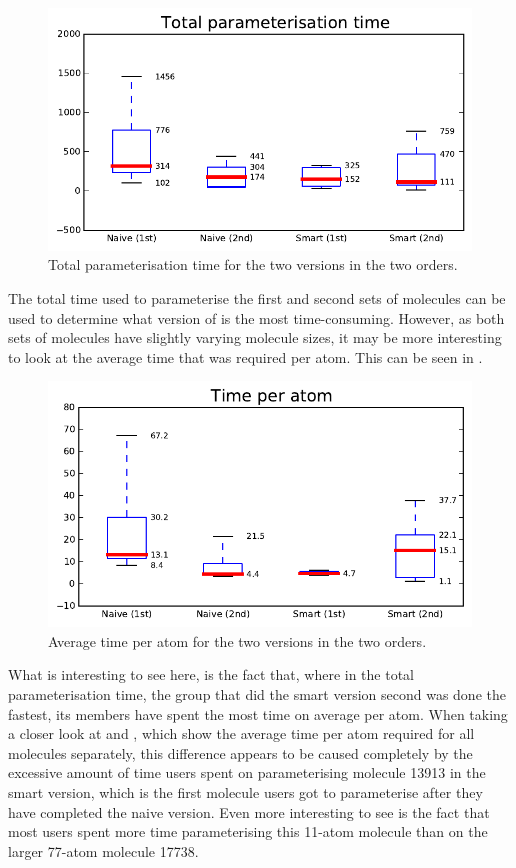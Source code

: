 \begin{figure}[h!]
\center
\includegraphics[width=.6\textwidth]{img/graphs/1a_02.pdf}
\caption{Total parameterisation time for the two versions in the two orders.}
\end{figure}

The total time used to parameterise the first and second sets of molecules can be used to determine what version of \oframp{} is the most time-consuming. However, as both sets of molecules have slightly varying molecule sizes, it may be more interesting to look at the average time that was required per atom. This can be seen in .

\begin{figure}[h!]
\center
\includegraphics[width=.6\textwidth]{img/graphs/1a_03.pdf}
\caption{Average time per atom for the two versions in the two orders.}
\end{figure}

What is interesting to see here, is the fact that, where in the total parameterisation time, the group that did the smart version second was done the fastest, its members have spent the most time on average per atom. When taking a closer look at  and , which show the average time per atom required for all molecules separately, this difference appears to be caused completely by the excessive amount of time users spent on parameterising molecule 13913 in the smart version, which is the first molecule users got to parameterise after they have completed the naive version. Even more interesting to see is the fact that most users spent more time parameterising this 11-atom molecule than on the larger 77-atom molecule 17738.

